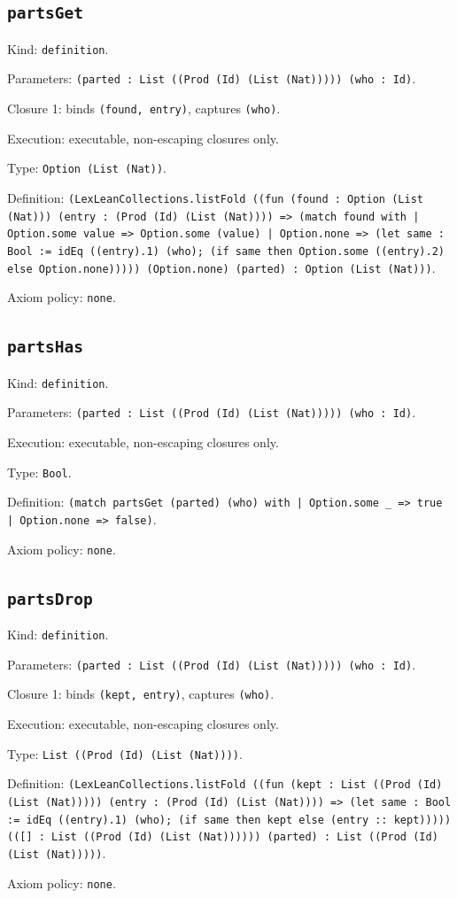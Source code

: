 \documentclass[11pt]{article}
\begin{document}
\subsection*{\texttt{partsGet}}
\noindent Kind: \texttt{definition}.\par
\noindent Parameters: \texttt{(parted : List ((Prod (Id) (List (Nat))))) (who : Id)}.\par
\noindent Closure 1: binds \texttt{(found, entry)}, captures \texttt{(who)}.\par
\noindent Execution: executable, non-escaping closures only.\par
\noindent Type: \texttt{Option (List (Nat))}.\par
\noindent Definition: \texttt{(LexLeanCollections.listFold ((fun (found : Option (List (Nat))) (entry : (Prod (Id) (List (Nat)))) => (match found with | Option.some value => Option.some (value) | Option.none => (let same : Bool := idEq ((entry).1) (who); (if same then Option.some ((entry).2) else Option.none))))) (Option.none) (parted) : Option (List (Nat)))}.\par
\noindent Axiom policy: \texttt{none}.\par
\subsection*{\texttt{partsHas}}
\noindent Kind: \texttt{definition}.\par
\noindent Parameters: \texttt{(parted : List ((Prod (Id) (List (Nat))))) (who : Id)}.\par
\noindent Execution: executable, non-escaping closures only.\par
\noindent Type: \texttt{Bool}.\par
\noindent Definition: \texttt{(match partsGet (parted) (who) with | Option.some \_ => true | Option.none => false)}.\par
\noindent Axiom policy: \texttt{none}.\par
\subsection*{\texttt{partsDrop}}
\noindent Kind: \texttt{definition}.\par
\noindent Parameters: \texttt{(parted : List ((Prod (Id) (List (Nat))))) (who : Id)}.\par
\noindent Closure 1: binds \texttt{(kept, entry)}, captures \texttt{(who)}.\par
\noindent Execution: executable, non-escaping closures only.\par
\noindent Type: \texttt{List ((Prod (Id) (List (Nat))))}.\par
\noindent Definition: \texttt{(LexLeanCollections.listFold ((fun (kept : List ((Prod (Id) (List (Nat))))) (entry : (Prod (Id) (List (Nat)))) => (let same : Bool := idEq ((entry).1) (who); (if same then kept else (entry :: kept))))) (([] : List ((Prod (Id) (List (Nat)))))) (parted) : List ((Prod (Id) (List (Nat)))))}.\par
\noindent Axiom policy: \texttt{none}.\par
\end{document}
